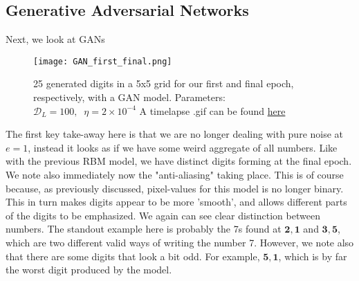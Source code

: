 \documentclass{article}
\begin{document}
\subsection{Generative Adversarial Networks}
Next, we look at GANs
\begin{figure}[ht!]
    \centering
    \texttt{[image: GAN\_first\_final.png]}
    \caption{25 generated digits in a 5x5 grid for our first and final epoch, respectively, with a GAN model. \newline
    Parameters: $\mathcal{D}_{L} = 100, \; \; \eta = 2\times10^{-4}$
    \newline 
    A timelapse .gif can be found \href{https://github.com/simloken/Generative_Imaging/blob/main/Figures/GAN_evolution.gif}{here}}
    \label{figGAN}
\end{figure}
\newline
The first key take-away here is that we are no longer dealing with pure noise at $e = 1$, instead it looks as if we have some weird aggregate of all numbers. Like with the previous RBM model, we have distinct digits forming at the final epoch. We note also immediately now the "anti-aliasing" taking place. This is of course because, as previously discussed, pixel-values for this model is no longer binary. This in turn makes digits appear to be more 'smooth', and allows different parts of the digits to be emphasized. \newline
We again can see clear distinction between numbers. The standout example here is probably the 7s found at $\mathbf{2, 1}$ and $\mathbf{3,5}$, which are two different valid ways of writing the number 7. \newline
However, we note also that there are some digits that look a bit odd. For example, $\mathbf{5,1}$, which is by far the worst digit produced by the model.
\newpage
\end{document}
